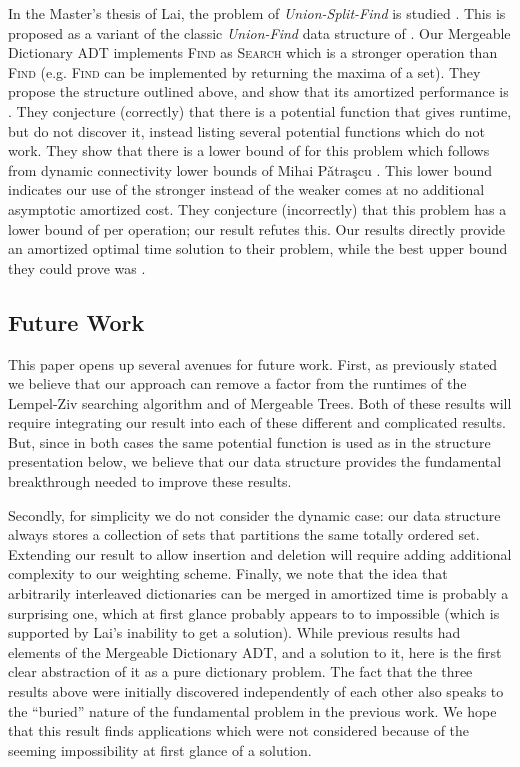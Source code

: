 \documentclass[11pt]{article}
\newcommand{\Ds}{Mergeable Dictionary}
\newcommand{\kwSrc}{Search}
\newcommand{\kwFind}{Find}
\newcommand{\Src}{\mbox{\textsc{\kwSrc}}}
\newcommand{\Find}{\mbox{\textsc{\kwFind}}}
\begin{document}
In the Master's thesis of Lai, the problem of \emph{Union-Split-Find} is studied \cite{klaithesis}. This is proposed as a variant of the classic \emph{Union-Find} data structure of \cite{journals/jacm/Tarjan75}. Our \Ds{} ADT implements \Find{} as \Src{} which is a stronger operation than \Find{} (e.g. \Find{} can be implemented by returning the maxima of a set). 
They propose the  structure outlined above, and show that its amortized performance is . They conjecture (correctly) that there is a potential function that gives  runtime, but do not discover it, instead listing several potential functions which do not work.  They show that there is a lower bound of  for this problem which follows from dynamic connectivity lower bounds of Mihai P\v{a}tra\c{s}cu \cite{conf/stoc/PatrascuD04}. This lower bound indicates our use of the stronger  instead of the weaker  comes at no additional asymptotic amortized cost. They conjecture (incorrectly) that this problem has a lower bound of  per operation; our  result refutes this. Our results directly provide an amortized optimal  time solution to their problem, while the best upper bound they could prove was . 



\subsection{Future Work} 

This paper opens up several avenues for future work. First, as previously stated we believe that our approach can remove a  factor from the runtimes of the Lempel-Ziv searching algorithm and of Mergeable Trees. Both of these results will require integrating our result into each of these different and complicated results. But, since in both cases the same potential function is used as in the  structure presentation below, we believe that our data structure provides the fundamental breakthrough needed to improve these results. 


Secondly, for simplicity we do not consider the dynamic case: our data structure always stores a collection of sets that partitions the same totally ordered set. Extending our result to allow insertion and deletion will require adding additional complexity to our weighting scheme. Finally, we note that the idea that arbitrarily interleaved dictionaries can be merged in  amortized time is probably a surprising one, which at first glance probably appears to to impossible (which is supported by Lai's inability to get a  solution). While previous results had elements of the \Ds{} ADT, and a  solution to it, here is the first clear abstraction of it as a pure dictionary problem. 
The fact that the three results above were initially discovered independently of each other also speaks to the ``buried'' nature of the fundamental problem in the previous work. 
We hope that this result finds applications which were not considered because of the seeming impossibility at first glance of a  solution. 
\end{document}
